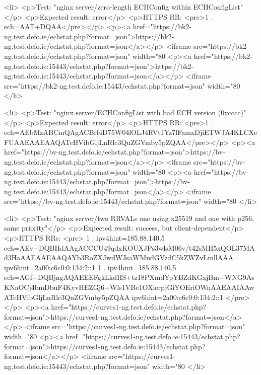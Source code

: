 <li>
<p>Test: "nginx server/zero-length ECHConfig within ECHConfigList"</p>
<p>Expected result: error</p>
<p>HTTPS RR: <pre>1 . ech=AAT+DQAA</pre></p>
<p><a href="https://bk2-ng.test.defo.ie/echstat.php?format=json">https://bk2-ng.test.defo.ie/echstat.php?format=json</a></p>
<iframe src="https://bk2-ng.test.defo.ie/echstat.php?format=json" width="80%
<p><a href="https://bk2-ng.test.defo.ie:15443/echstat.php?format=json">https://bk2-ng.test.defo.ie:15443/echstat.php?format=json</a></p>
<iframe src="https://bk2-ng.test.defo.ie:15443/echstat.php?format=json" width="80%
</li>

<li>
<p>Test: "nginx server/ECHConfigList with bad ECH version (0xcccc)"</p>
<p>Expected result: error</p>
<p>HTTPS RR: <pre>1 . ech=AEbMzABCmQAgACBrf4D75W04lOLJ4RVtJYz7lFamxDjiETWJA4KLCXeFUAAEAAEAAQATcHVibGljLnRlc3QuZGVmby5pZQAA</pre></p>
<p><a href="https://bv-ng.test.defo.ie/echstat.php?format=json">https://bv-ng.test.defo.ie/echstat.php?format=json</a></p>
<iframe src="https://bv-ng.test.defo.ie/echstat.php?format=json" width="80%
<p><a href="https://bv-ng.test.defo.ie:15443/echstat.php?format=json">https://bv-ng.test.defo.ie:15443/echstat.php?format=json</a></p>
<iframe src="https://bv-ng.test.defo.ie:15443/echstat.php?format=json" width="80%
</li>

<li>
<p>Test: "nginx server/two RRVALs one using x25519 and one with p256, same priority"</p>
<p>Expected result: success, but client-dependent</p>
<p>HTTPS RRs: <pre>
1 . ipv4hint=185.88.140.5 ech=AEv+DQBHdAAgACCCU49qdxKOUXJPs3wlsM06v/t42sMH5xQOL37MAd3HaAAEAAEAAQAYb3RoZXJwdWJsaWMudGVzdC5kZWZvLmllAAA= ipv6hint=2a00:c6c0:0:134:2::1
1 . ipv4hint=185.88.140.5 ech=AGf+DQBjngAQAEEEFgkLkdHS+tz18PXmdYpYBZdKGxjBm+WNG9AsKNaOCj4bmDbuF4KyvHEZGj6+Wls1VBe1OXierpjGiYOEriOWnAAEAAIAAwATcHVibGljLnRlc3QuZGVmby5pZQAA ipv6hint=2a00:c6c0:0:134:2::1
</pre></p>
<p><a href="https://curves1-ng.test.defo.ie/echstat.php?format=json">https://curves1-ng.test.defo.ie/echstat.php?format=json</a></p>
<iframe src="https://curves1-ng.test.defo.ie/echstat.php?format=json" width="80%
<p><a href="https://curves1-ng.test.defo.ie:15443/echstat.php?format=json">https://curves1-ng.test.defo.ie:15443/echstat.php?format=json</a></p>
<iframe src="https://curves1-ng.test.defo.ie:15443/echstat.php?format=json" width="80%
</li>

